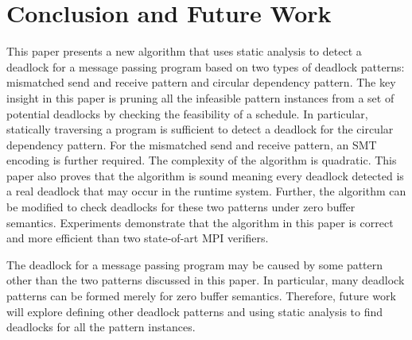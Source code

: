 \section{Conclusion and Future Work}
This paper presents a new algorithm that uses static analysis to detect a deadlock for a message passing program based on two types of deadlock patterns: mismatched send and receive pattern and circular dependency pattern. The key insight in this paper is pruning all the infeasible pattern instances from a set of potential deadlocks by checking the feasibility of a schedule. In particular, statically traversing a program is sufficient to detect a deadlock for the circular dependency pattern. For the mismatched send and receive pattern, an SMT encoding is further required. The complexity of the algorithm is quadratic. This paper also proves that the algorithm is sound meaning every deadlock detected is a real deadlock that may occur in the runtime system. Further, the algorithm can be modified to check deadlocks for these two patterns under zero buffer semantics. Experiments demonstrate that the algorithm in this paper is correct and more efficient than two state-of-art MPI verifiers.

The deadlock for a message passing program may be caused by some pattern other than the two patterns discussed in this paper. In particular, many deadlock patterns can be formed merely for zero buffer semantics. Therefore, future work will explore defining other deadlock patterns and using static analysis to find deadlocks for all the pattern instances. 

\newpage
